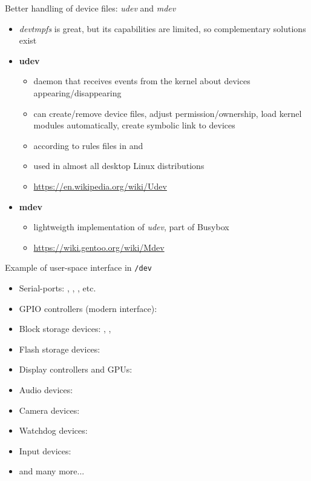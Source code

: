 \begin{frame}{Better handling of device files: {\em udev} and {\em mdev}}
  \begin{itemize}
  \item {\em devtmpfs} is great, but its capabilities are limited, so
    complementary solutions exist
  \item {\bf udev}
    \begin{itemize}
    \item daemon that receives events from the kernel about devices
      appearing/disappearing
    \item can create/remove device files, adjust permission/ownership,
      load kernel modules automatically, create symbolic link to
      devices
    \item according to rules files in  and
    \item used in almost all desktop Linux distributions
    \item \url{https://en.wikipedia.org/wiki/Udev}
    \end{itemize}
  \item {\bf mdev}
    \begin{itemize}
    \item lightweigth implementation of {\em udev}, part of Busybox
    \item \url{https://wiki.gentoo.org/wiki/Mdev}
    \end{itemize}
  \end{itemize}
\end{frame}

\begin{frame}{Example of user-space interface in {\tt /dev}}
  \begin{itemize}
  \item Serial-ports: , ,
    , etc.
  \item GPIO controllers (modern interface): 
  \item Block storage devices: , , 
  \item Flash storage devices: 
  \item Display controllers and GPUs: 
  \item Audio devices: 
  \item Camera devices: 
  \item Watchdog devices: 
  \item Input devices: 
  \item and many more...
  \end{itemize}
\end{frame}

